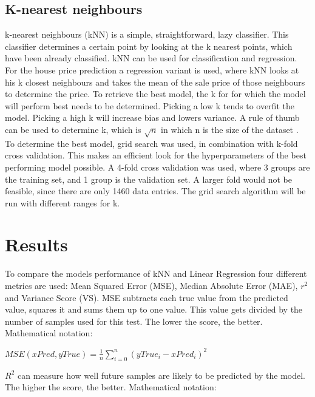 \documentclass[a4paper,11pt]{article}
\begin{document}
\subsection{K-nearest neighbours}
k-nearest neighbours (kNN) is a simple, straightforward, lazy classifier. This classifier determines a certain point by looking at the k nearest points, which have been already classified. kNN can be used for classification and regression. For the house price prediction a regression variant is used, where kNN looks at his k closest neighbours and takes the mean of the sale price of those neighbours to determine the price. To retrieve the best model, the k for for which the model will perform best needs to be determined. Picking a low k tends to overfit the model. Picking a high k will increase bias and lowers variance. A rule of thumb can be used to determine k, which is $\sqrt{n}$ in which n is the size of the dataset \cite{james_witten_hastie_tibshirani_2013}.\\
To determine the best model, grid search \cite{bergstra_bengio_2012} was used, in combination with k-fold cross validation. This makes an efficient look for the hyperparameters of the best performing model possible. A 4-fold cross validation was used, where 3 groups are the training set, and 1 group is the validation set. A larger fold would not be feasible, since there are only 1460 data entries. The grid search algorithm will be run with different ranges for k.
	 

\clearpage
\section{Results}
To compare the models performance of kNN and Linear Regression four different metrics are used: Mean Squared Error (MSE), Median Absolute Error (MAE), $r^2$ and Variance Score (VS). MSE subtracts each true value from the predicted value, squares it and sums them up to one value. This value gets divided by the number of samples used for this test. The lower the score, the better. Mathematical notation:
\\

\begin{center}
$MSE(xPred,yTrue)=\frac{1}{n} \sum\limits_{i=0}^n(yTrue_i-xPred_i)^2$
\end{center}

$R^2$ can measure how well future samples are likely to be predicted by the model. The higher the score, the better. Mathematical notation:
\end{document}
